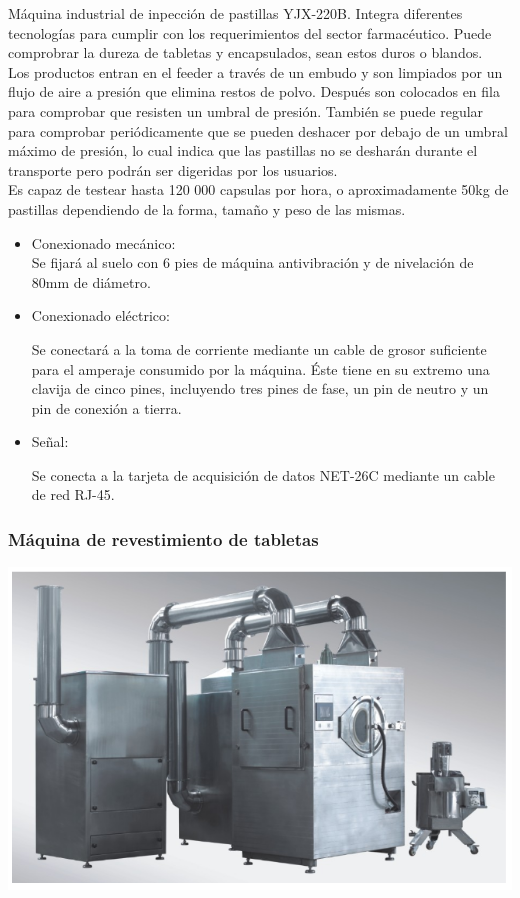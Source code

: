 	Máquina industrial de inpección de pastillas YJX-220B. Integra diferentes tecnologías para cumplir con los requerimientos del sector farmacéutico. Puede comprobrar la dureza de tabletas y encapsulados, sean estos duros o blandos.\\

	Los productos entran en el feeder a través de un embudo y son limpiados por un flujo de aire a presión que elimina restos de polvo. Después son colocados en fila para comprobar que resisten un umbral de presión. También se puede regular para comprobar periódicamente que se pueden deshacer por debajo de un umbral máximo de presión, lo cual indica que las pastillas no se desharán durante el transporte pero podrán ser digeridas por los usuarios.\\


	Es capaz de testear hasta 120 000 capsulas por hora, o aproximadamente 50kg de pastillas dependiendo de la forma, tamaño y peso de las mismas.\\



		\begin{itemize}
				\item{Conexionado mecánico:}\\
				
				Se fijará al suelo con 6 pies de máquina antivibración y de nivelación de 80mm de diámetro.

				\item{Conexionado eléctrico:}

				Se conectará a la toma de corriente mediante un cable de grosor suficiente para el amperaje consumido por la máquina. Éste tiene en su extremo una clavija de cinco pines, incluyendo tres pines de fase, un pin de neutro y un pin de conexión a tierra.  
				
				\item{Señal:}

				Se conecta a la tarjeta de acquisición de datos NET-26C mediante un cable de red RJ-45.
		\end{itemize}

	\newpage


	\subsubsection{Máquina de revestimiento de tabletas}
		
	\includegraphics[scale=0.5]{Datasheets/4Foto.png}
	
